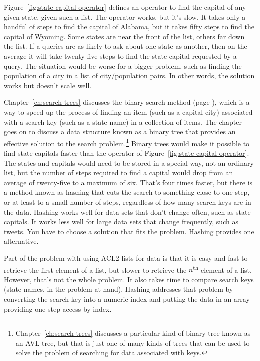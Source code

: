 Figure~\ref{fig:state-capital-operator}
defines an operator to find the
capital of any given state, given such a list.
The operator works, but it's slow.
It takes only a handful of steps to find the capital of Alabama, 
but it takes fifty steps to find the capital of Wyoming.
Some states are near the front of the list,
others far down the list.
If a queries are as likely to ask about
one state as another,
then on the average it will take twenty-five steps to find
the state capital requested by a query.
The situation would be worse for a bigger problem,
such as finding the population of a city in a list of city/population pairs.
In other words, the solution works but doesn't scale well.

Chapter~\ref{ch:search-trees} discusses the binary search
method (page \pageref{binary-search-method}),
which is a way to speed up the process of finding an item
(such as a capital city)
associated with a search key (such as a state name) in a
collection of items. The chapter goes on to discuss
a data structure known as a binary tree
that provides an effective solution to the search
problem.\footnote{Chapter~\ref{ch:search-trees}
discusses a particular kind of binary tree known as an AVL tree,
but that is just one of many kinds of trees
that can be used to solve the problem of searching
for data associated with keys.}
Binary trees would make it possible to find
state capitals faster
than the operator of Figure~\ref{fig:state-capital-operator}.
The states and capitals would need to be stored
in a special way, not an ordinary list,
but the number of steps required to find a capital
would drop from an average of twenty-five to a maximum of six.
That's four times faster, but there is a method known as hashing
that cuts the search to something close to one step, or at least
to a small number of steps, regardless of how
many search keys are in the data.
Hashing works well for data sets that don't change often,
such as state capitals. It works less well for large
data sets that change frequently, such as tweets.
You have to choose a solution that fits the problem.
Hashing provides one alternative.

Part of the problem with using ACL2 lists
for data is that it is easy and fast to retrieve the
first element of a list, but slower to retrieve the
$n$\textsuperscript{th} element of a list.
However, that's not the whole problem.
It also takes time to compare search keys
(state names, in the problem at hand).
Hashing addresses that problem by converting the search key
into a numeric index and putting the data
in an array providing one-step access by index.

